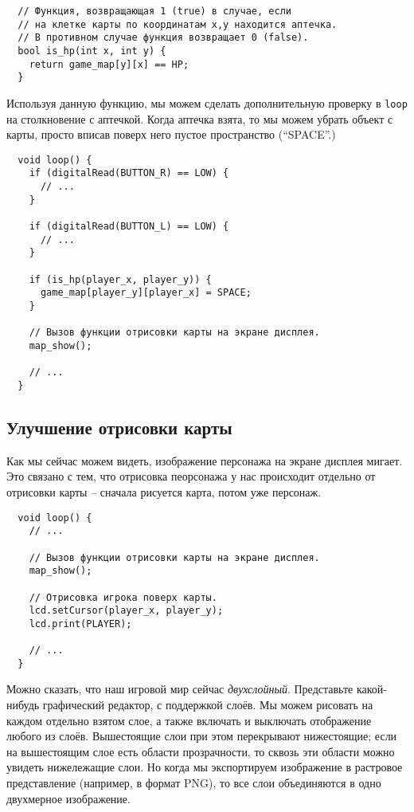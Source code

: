 \documentclass[../sparc.tex]{subfiles}
\begin{document}
\begin{verbatim}
  // Функция, возвращающая 1 (true) в случае, если
  // на клетке карты по координатам x,y находится аптечка.
  // В противном случае функция возвращает 0 (false).
  bool is_hp(int x, int y) {
    return game_map[y][x] == HP;
  }
\end{verbatim}

Используя данную функцию, мы можем сделать дополнительную проверку в
\texttt{loop} на столкновение с аптечкой.  Когда аптечка взята, то мы можем
убрать объект с карты, просто вписав поверх него пустое пространство
(``SPACE''.)

\begin{verbatim}
  void loop() {
    if (digitalRead(BUTTON_R) == LOW) {
      // ...
    }

    if (digitalRead(BUTTON_L) == LOW) {
      // ...
    }

    if (is_hp(player_x, player_y)) {
      game_map[player_y][player_x] = SPACE;
    }

    // Вызов функции отрисовки карты на экране дисплея.
    map_show();

    // ...
  }
\end{verbatim}

\subsection{Улучшение отрисовки карты}

Как мы сейчас можем видеть, изображение персонажа на экране дисплея мигает. Это
связано с тем, что отрисовка пеорсонажа у нас происходит отдельно от отрисовки
карты -- сначала рисуется карта, потом уже персонаж.

\begin{verbatim}
  void loop() {
    // ...

    // Вызов функции отрисовки карты на экране дисплея.
    map_show();

    // Отрисовка игрока поверх карты.
    lcd.setCursor(player_x, player_y);
    lcd.print(PLAYER);

    // ...
  }
\end{verbatim}

Можно сказать, что наш игровой мир сейчас \emph{двухслойный}.  Представьте
какой-нибудь графический редактор, с поддержкой слоёв.  Мы можем рисовать на
каждом отдельно взятом слое, а также включать и выключать отображение любого из
слоёв.  Вышестоящие слои при этом перекрывают нижестоящие; если на вышестоящим
слое есть области прозрачности, то сквозь эти области можно увидеть нижележащие
слои.  Но когда мы экспортируем изображение в растровое представление (например,
в формат PNG), то все слои объединяются в одно двухмерное изображение.
\end{document}
